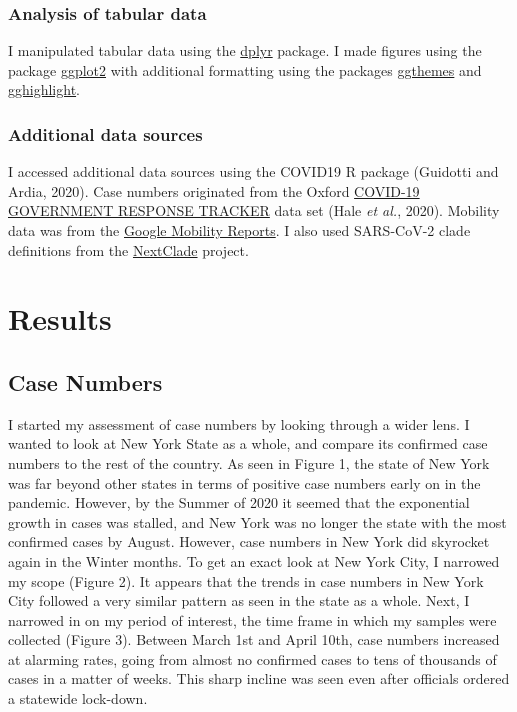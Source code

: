 \documentclass[
]{article}
\begin{document}
\hypertarget{analysis-of-tabular-data}{%
\subsubsection{Analysis of tabular
data}\label{analysis-of-tabular-data}}

I manipulated tabular data using the
\href{https://dplyr.tidyverse.org/}{dplyr} package. I made figures using
the package
\href{https://ggplot2.tidyverse.org/reference/index.html}{ggplot2} with
additional formatting using the packages
\href{https://cran.r-project.org/web/packages/ggthemes/index.html}{ggthemes}
and
\href{https://cran.r-project.org/web/packages/gghighlight/vignettes/gghighlight.html}{gghighlight}.

\hypertarget{additional-data-sources}{%
\subsubsection{Additional data sources}\label{additional-data-sources}}

I accessed additional data sources using the COVID19 R package (Guidotti
and Ardia, 2020). Case numbers originated from the Oxford
\href{https://www.bsg.ox.ac.uk/research/research-projects/covid-19-government-response-tracker}{COVID-19
GOVERNMENT RESPONSE TRACKER} data set (Hale \emph{et al.}, 2020).
Mobility data was from the
\href{https://www.google.com/covid19/mobility/}{Google Mobility
Reports}. I also used SARS-CoV-2 clade definitions from the
\href{https://clades.nextstrain.org/}{NextClade} project.

\hypertarget{results}{%
\section{Results}\label{results}}

\hypertarget{case-numbers}{%
\subsection{Case Numbers}\label{case-numbers}}

I started my assessment of case numbers by looking through a wider lens.
I wanted to look at New York State as a whole, and compare its confirmed
case numbers to the rest of the country. As seen in Figure 1, the state
of New York was far beyond other states in terms of positive case
numbers early on in the pandemic. However, by the Summer of 2020 it
seemed that the exponential growth in cases was stalled, and New York
was no longer the state with the most confirmed cases by August.
However, case numbers in New York did skyrocket again in the Winter
months. To get an exact look at New York City, I narrowed my scope
(Figure 2). It appears that the trends in case numbers in New York City
followed a very similar pattern as seen in the state as a whole. Next, I
narrowed in on my period of interest, the time frame in which my samples
were collected (Figure 3). Between March 1st and April 10th, case
numbers increased at alarming rates, going from almost no confirmed
cases to tens of thousands of cases in a matter of weeks. This sharp
incline was seen even after officials ordered a statewide lock-down.
\end{document}
